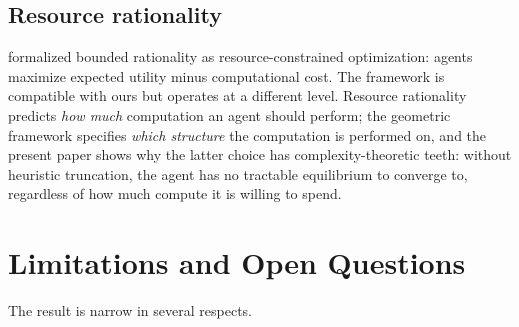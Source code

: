 \documentclass[11pt]{article}
\theoremstyle{definition}
\theoremstyle{remark}
\begin{document}
\subsection{Resource rationality}

\cite{lieder2020} formalized bounded rationality as resource-constrained optimization: agents
maximize expected utility minus computational cost. The framework is compatible with ours but
operates at a different level. Resource rationality predicts \emph{how much} computation an agent
should perform; the geometric framework specifies \emph{which structure} the computation is performed
on, and the present paper shows why the latter choice has complexity-theoretic teeth: without
heuristic truncation, the agent has no tractable equilibrium to converge to, regardless of how much
compute it is willing to spend.


\section{Limitations and Open Questions}
\label{sec:limitations}

The result is narrow in several respects.
\end{document}
